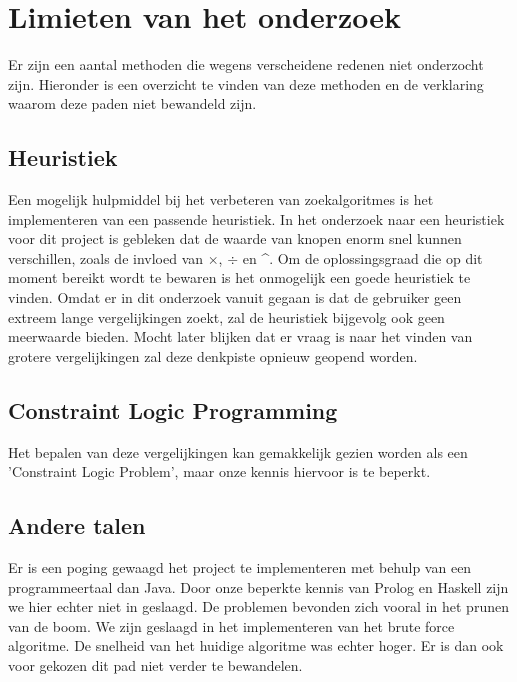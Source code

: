 \documentclass[Main.tex]{subfiles}
\begin{document}
\section{Limieten van het onderzoek}

Er zijn een aantal methoden die wegens verscheidene redenen niet onderzocht zijn. Hieronder is een overzicht te vinden van deze methoden en de verklaring waarom deze paden niet bewandeld zijn. 

\subsection{Heuristiek}
Een mogelijk hulpmiddel bij het verbeteren van zoekalgoritmes is het implementeren van een passende heuristiek. In het onderzoek naar een heuristiek voor dit project is gebleken dat de waarde van knopen enorm snel kunnen verschillen, zoals de invloed van $\times$, $\div$ en \^{}. Om de oplossingsgraad die op dit moment bereikt wordt te bewaren is het onmogelijk een goede heuristiek te vinden. Omdat er in dit onderzoek vanuit gegaan is dat de gebruiker geen extreem lange vergelijkingen zoekt, zal de heuristiek bijgevolg ook geen meerwaarde bieden. Mocht later blijken dat er vraag is naar het vinden van grotere vergelijkingen zal deze denkpiste opnieuw geopend worden.

\subsection{Constraint Logic Programming}
Het bepalen van deze vergelijkingen kan gemakkelijk gezien worden als een 'Constraint Logic Problem', maar onze kennis hiervoor is te beperkt.

\subsection{Andere talen}
Er is een poging gewaagd het project te implementeren met behulp van een programmeertaal dan Java. Door onze beperkte kennis van Prolog en Haskell zijn we hier echter niet in geslaagd. De problemen bevonden zich vooral in het prunen van de boom. We zijn geslaagd in het implementeren van het brute force algoritme. De snelheid van het huidige algoritme was echter hoger. Er is dan ook voor gekozen dit pad niet verder te bewandelen.
\end{document}
